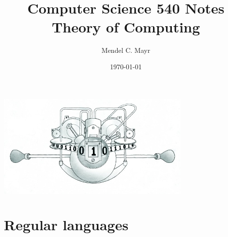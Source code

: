 \documentclass{article}
\title{Computer Science 540 Notes \\ Theory of Computing}
\author{Mendel C. Mayr}
\date{\today}
\newcommand*{\<}{\langle}
\renewcommand*{\>}{\rangle}
\begin{document}
	\maketitle
	\begin{center}
		\includegraphics[width = 3.8in]{turingMachine.jpg}
		\end{center}
	\tableofcontents
	\clearpage

	\section{Regular languages}
\end{document}
